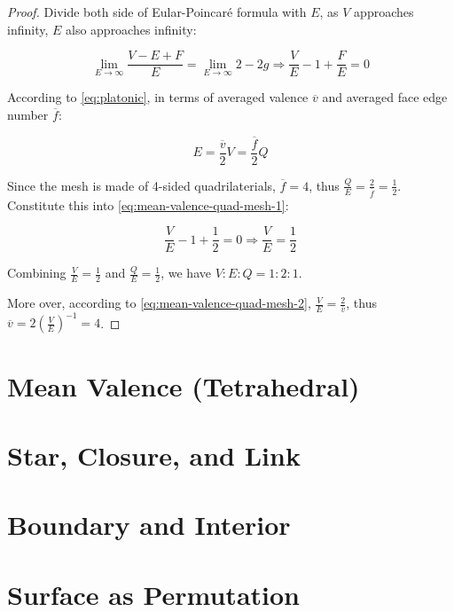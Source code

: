 \begin{proof}
    Divide both side of Eular-Poincar\'e formula with $E$, as $V$ approaches infinity, $E$ also approaches infinity:

    \begin{equation}
        \lim_{E \to \infty} \frac{V - E + F}{E} = \lim_{E \to \infty} 2 - 2g
        \Rightarrow \frac{V}{E} - 1 + \frac{F}{E} = 0
        \label{eq:mean-valence-quad-mesh-1}
    \end{equation}

    According to \autoref{eq:platonic}, in terms of averaged valence $\overline{v}$ and averaged face edge number $\overline{f}$:

    \begin{equation}
        E = \frac{\overline{v}}{2} V = \frac{\overline{f}}{2} Q
        \label{eq:mean-valence-quad-mesh-2}
    \end{equation}

    Since the mesh is made of 4-sided quadrilaterials, $\overline{f} = 4$, thus $\frac{Q}{E} = \frac{2}{\overline{f}} = \frac{1}{2}$. Constitute this into \autoref{eq:mean-valence-quad-mesh-1}:

    \begin{equation}
        \frac{V}{E} - 1 + \frac{1}{2} = 0
        \Rightarrow \frac{V}{E} = \frac{1}{2}
    \end{equation}

    Combining $\frac{V}{E} = \frac{1}{2}$ and $\frac{Q}{E} = \frac{1}{2}$, we have $V:E:Q = 1:2:1$.

    More over, according to \autoref{eq:mean-valence-quad-mesh-2}, $\frac{V}{E} = \frac{2}{\overline{v}}$, thus $\overline{v} = 2(\frac{V}{E})^{-1} = 4$.
\end{proof}

\section{Mean Valence (Tetrahedral)}

\section{Star, Closure, and Link}

\section{Boundary and Interior}

\section{Surface as Permutation}

